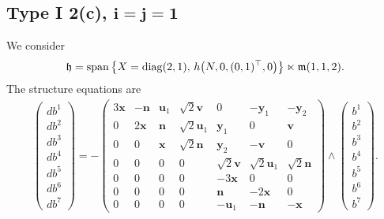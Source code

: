 \documentclass[11pt]{article}
\numberwithin{equation}{section}
\newcommand\fh{{\frak h}}
\newcommand\fm{{\frak m}}
\newcommand\bx{{\mathbf x}}
\newcommand\bu{{\mathbf u}}
\newcommand\by{{\mathbf y}}
\newcommand\bn{{\mathbf n}}
\newcommand\bv{{\mathbf v}}
\newcommand{\Span}{\operatorname{span}}
\newcommand{\diag}{\operatorname{diag}}
\begin{document}
\subsection[Type I 2(c), $i=j=1$]{Type I 2(c), $\boldsymbol{i=j=1}$}
We consider
\begin{gather*}\fh=\Span\big\{X=\diag(2,1), \, h\big(N,0,(0,1)^\top,0\big) \big\}\ltimes\fm(1,1,2).\end{gather*}
The structure equations are
\begin{gather}\label{EI2(c)ij=1}\left(\begin{matrix} db^1\\db^2\\db^3\\db^4\\db^5\\db^6\\db^7\end{matrix}\right) = -\left(
\begin{matrix}
3{\bx} &-\bn&\bu_1&\sqrt2 \bv&0&-\by_1&-\by_2\\
0&2\bx&\bn&\sqrt2 \bu_1&\by_1&0&\bv\\
0&0&\bx&\sqrt 2 \bn&\by_2&-\bv&0\\
0&0&0&0&\sqrt2 \bv&\sqrt2 \bu_1&\sqrt 2 \bn\\
0&0&0&0&-3\bx&0&0\\
0&0&0&0&\bn&-2\bx&0\\
0&0&0&0&-\bu_1&-\bn&-\bx
\end{matrix}\right) \wedge \left(\begin{matrix} b^1\\b^2\\b^3\\b^4\\b^5\\b^6\\b^7\end{matrix}\right).
\end{gather}
\end{document}
